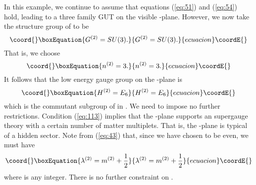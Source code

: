 \documentclass[a4paper,12pt]{article}
\numberwithin{equation}{section}
\theoremstyle{plain}
\begin{document}
In this example, we continue to assume that equations (\ref{eq:51}) and
(\ref{eq:54}) hold, leading to a three family \coordHE{} GUT on the visible
\coordHE{}-plane. However, we now take the structure group of \coordHE{} to be
%
\begin{equation}\coord{}\boxEquation{
G^{(2)}=SU(3).
\label{eq:112}
}{
G^{(2)}=SU(3).
}{ecuacion}\coordE{}\end{equation}
%
That is, we choose
%
\begin{equation}\coord{}\boxEquation{
n^{(2)}=3.
\label{eq:113}
}{
n^{(2)}=3.
}{ecuacion}\coordE{}\end{equation}
%
It follows that the low energy gauge group on the \coordHE{}-plane is 
%
\begin{equation}\coord{}\boxEquation{
H^{(2)}=E_{6}
\label{eq:114}
}{
H^{(2)}=E_{6}
}{ecuacion}\coordE{}\end{equation}
%
which is the commutant subgroup of \coordHE{} in \coordHE{}. We need to
impose no further restrictions. Condition (\ref{eq:113}) implies that the
\coordHE{}-plane supports an \coordHE{} supergauge theory with a certain number of
matter multiplets. That is, the \coordHE{}-plane is typical of a hidden sector. 
Note from (\ref{eq:43}) that, since we have chosen \coordHE{} to be even, we
must have
%
\begin{equation}\coord{}\boxEquation{
\lambda^{(2)}=m^{(2)} +\frac{1}{2}
\label{eq:115}
}{
\lambda^{(2)}=m^{(2)} +\frac{1}{2}
}{ecuacion}\coordE{}\end{equation}
%
where \coordHE{} is any integer. There is no further constraint on
\coordHE{}.
\end{document}
